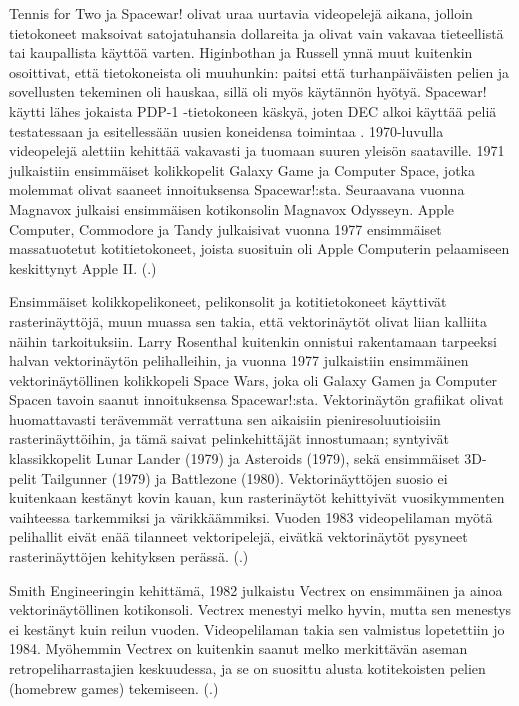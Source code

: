 \documentclass[utf8,bachelor]{gradu3}
\newcommand{\parencitedot}[1]{(\cite{#1}.)}
\begin{document}
Tennis for Two ja Spacewar! olivat uraa uurtavia videopelejä aikana, jolloin tietokoneet maksoivat satojatuhansia dollareita ja olivat vain vakavaa tieteellistä tai kaupallista käyttöä varten. Higinbothan ja Russell ynnä muut kuitenkin osoittivat, että tietokoneista oli muuhunkin: paitsi että turhanpäiväisten pelien ja sovellusten tekeminen oli hauskaa, sillä oli myös käytännön hyötyä. Spacewar! käytti lähes jokaista PDP-1 -tietokoneen käskyä, joten DEC alkoi käyttää peliä testatessaan ja esitellessään uusien koneidensa toimintaa \parencite{RefWorks:doc:5beac148e4b08968d042364b}. 1970-luvulla videopelejä alettiin kehittää vakavasti ja tuomaan suuren yleisön saataville. 1971 julkaistiin ensimmäiset kolikkopelit Galaxy Game ja Computer Space, jotka molemmat olivat saaneet innoituksensa Spacewar!:sta. Seuraavana vuonna Magnavox julkaisi ensimmäisen kotikonsolin Magnavox Odysseyn. Apple Computer, Commodore ja Tandy julkaisivat vuonna 1977 ensimmäiset massatuotetut kotitietokoneet, joista suosituin oli Apple Computerin pelaamiseen keskittynyt Apple II. \parencitedot{RefWorks:doc:5be15b13e4b05b9281959f24}

Ensimmäiset kolikkopelikoneet, pelikonsolit ja kotitietokoneet käyttivät rasterinäyttöjä, muun muassa sen takia, että vektorinäytöt olivat liian kalliita näihin tarkoituksiin. Larry Rosenthal kuitenkin onnistui rakentamaan tarpeeksi halvan vektorinäytön pelihalleihin, ja vuonna 1977 julkaistiin ensimmäinen vektorinäytöllinen kolikkopeli Space Wars, joka oli Galaxy Gamen ja Computer Spacen tavoin saanut innoituksensa Spacewar!:sta. Vektorinäytön grafiikat olivat huomattavasti terävemmät verrattuna sen aikaisiin pieniresoluutioisiin rasterinäyttöihin, ja tämä saivat pelinkehittäjät innostumaan; syntyivät klassikkopelit Lunar Lander (1979) ja Asteroids (1979), sekä ensimmäiset 3D-pelit Tailgunner (1979) ja Battlezone (1980). Vektorinäyttöjen suosio ei kuitenkaan kestänyt kovin kauan, kun rasterinäytöt kehittyivät vuosikymmenten vaihteessa tarkemmiksi ja värikkäämmiksi. Vuoden 1983 videopelilaman myötä pelihallit eivät enää tilanneet vektoripelejä, eivätkä vektorinäytöt pysyneet rasterinäyttöjen kehityksen perässä. \parencitedot{RefWorks:doc:5be15b13e4b05b9281959f24}

Smith Engineeringin kehittämä, 1982 julkaistu Vectrex on ensimmäinen ja ainoa vektorinäytöllinen kotikonsoli. Vectrex menestyi melko hyvin, mutta sen menestys ei kestänyt kuin reilun vuoden. Videopelilaman takia sen  valmistus lopetettiin jo 1984. Myöhemmin Vectrex on kuitenkin saanut melko merkittävän aseman retropeliharrastajien keskuudessa, ja se on suosittu alusta kotitekoisten pelien (homebrew games) tekemiseen. \parencitedot{RefWorks:doc:5bed604be4b02374b62fe1b5}
\end{document}
